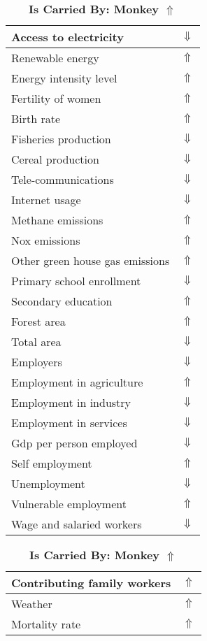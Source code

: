 \documentclass[12pt,notitlepage,oneside]{report}
\begin{document}
\begin{table}[!htb]
\caption{\textbf{Is Carried By: Monkey $\Uparrow$}}
\centering
\label{Correlated Socio-economic Factors0}
\begin{tabular}{|l|l|}
\hline
Access to electricity & $\Downarrow$\\ \hline
Renewable energy & $\Uparrow$\\ \hline
Energy intensity level & $\Uparrow$\\ \hline
Fertility of women & $\Uparrow$\\ \hline
Birth rate & $\Uparrow$\\ \hline
Fisheries production & $\Downarrow$\\ \hline
Cereal production & $\Downarrow$\\ \hline
Tele-communications & $\Downarrow$\\ \hline
Internet usage & $\Downarrow$\\ \hline
Methane emissions & $\Uparrow$\\ \hline
Nox emissions & $\Uparrow$\\ \hline
Other green house gas emissions & $\Uparrow$\\ \hline
Primary school enrollment & $\Downarrow$\\ \hline
Secondary education & $\Uparrow$\\ \hline
Forest area & $\Uparrow$\\ \hline
Total area & $\Downarrow$\\ \hline
Employers & $\Downarrow$\\ \hline
Employment in agriculture & $\Uparrow$\\ \hline
Employment in industry & $\Downarrow$\\ \hline
Employment in services & $\Downarrow$\\ \hline
Gdp per person employed & $\Downarrow$\\ \hline
Self employment & $\Uparrow$\\ \hline
Unemployment & $\Downarrow$\\ \hline
Vulnerable employment & $\Uparrow$\\ \hline
Wage and salaried workers & $\Downarrow$\\ \hline
\end{tabular}
\begin{tabular}{|l|l|}
\hline
Contributing family workers & $\Uparrow$\\ \hline
Weather & $\Uparrow$\\ \hline
Mortality rate & $\Uparrow$\\ \hline

\end{tabular}
\end{table}
\end{document}
